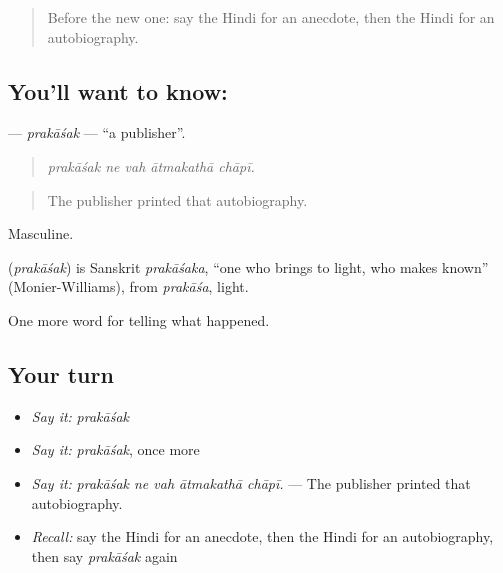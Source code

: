 \label{lesson:HI-C342-prakasak}



\begin{quote}
Before the new one: say the Hindi for an anecdote, then the Hindi for an autobiography.
\end{quote}

\subsection*{You'll want to know: }
\textbf{} — \emph{prakāśak} — \textquotedblleft{}a publisher\textquotedblright{}.

\begin{quote}
    
\end{quote}

\begin{quote}
\emph{prakāśak ne vah ātmakathā chāpī.}
\end{quote}

\begin{quote}
The publisher printed that autobiography.
\end{quote}

Masculine.

\begin{cousinweb}
\textbf{} (\emph{prakāśak}) is Sanskrit \emph{prakāśaka}, \textquotedblleft{}one who brings to light, who makes known\textquotedblright{} (Monier-Williams), from \emph{prakāśa}, light.
\end{cousinweb}

\begin{grammarlens}[title={What you've built}]
One more word for telling what happened.
\end{grammarlens}

\subsection*{Your turn}
\begin{itemize}
\raggedright
  \item \emph{Say it:} \emph{prakāśak}
  \item \emph{Say it:} \emph{prakāśak}, once more
  \item \emph{Say it:} \emph{prakāśak ne vah ātmakathā chāpī.} — The publisher printed that autobiography.
  \item \emph{Recall:} say the Hindi for an anecdote, then the Hindi for an autobiography, then say \emph{prakāśak} again
\end{itemize}

